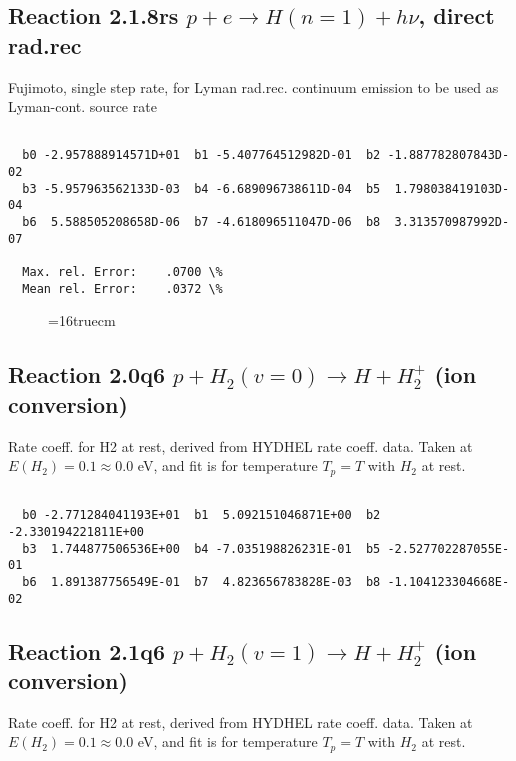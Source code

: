 \documentclass[12pt,dvipdfmx]{article}
\begin{document}
\subsection{
Reaction 2.1.8rs
 $ p + e \rightarrow H(n=1) + h\nu$, direct rad.rec
}
Fujimoto, single step rate, for Lyman rad.rec. continuum emission
to be used as Lyman-cont. source rate

\begin{small}\begin{verbatim}

  b0 -2.957888914571D+01  b1 -5.407764512982D-01  b2 -1.887782807843D-02
  b3 -5.957963562133D-03  b4 -6.689096738611D-04  b5  1.798038419103D-04
  b6  5.588505208658D-06  b7 -4.618096511047D-06  b8  3.313570987992D-07

  Max. rel. Error:    .0700 \%
  Mean rel. Error:    .0372 \%

\end{verbatim}\end{small}
\begin{figure} \label{2.1.8rs}
\epsfxsize=16truecm
\end{figure}
\subsection{
Reaction 2.0q6
$ p + H_2(v=0) \rightarrow H + H_2^+$ (ion conversion)
}
Rate coeff. for H2 at rest, derived from HYDHEL rate coeff. data.
Taken at $E(H_2) = 0.1 \approx 0.0$ eV,  and fit is for temperature $T_p=T$ with $H_2$ at rest.

\begin{small}\begin{verbatim}

  b0 -2.771284041193E+01  b1  5.092151046871E+00  b2 -2.330194221811E+00
  b3  1.744877506536E+00  b4 -7.035198826231E-01  b5 -2.527702287055E-01
  b6  1.891387756549E-01  b7  4.823656783828E-03  b8 -1.104123304668E-02

\end{verbatim}\end{small}

\newpage
\subsection{
Reaction 2.1q6
$ p + H_2(v=1) \rightarrow H + H_2^+$ (ion conversion)
}
Rate coeff. for H2 at rest, derived from HYDHEL rate coeff. data.
Taken at $E(H_2) = 0.1 \approx 0.0$ eV,  and fit is for temperature $T_p=T$ with $H_2$ at rest.
\end{document}
